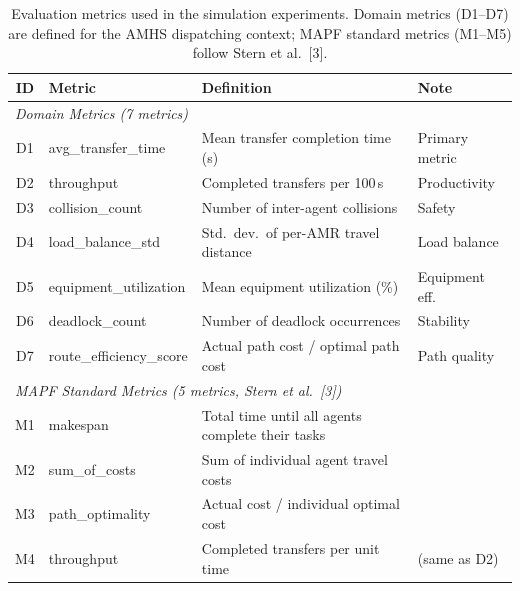 \begin{table}[htbp]
  \centering
  \caption{Evaluation metrics used in the simulation experiments.
           Domain metrics (D1--D7) are defined for the AMHS dispatching context;
           MAPF standard metrics (M1--M5) follow Stern et al.~[3].}
  \label{tab:4}
  \small
  \begin{threeparttable}
    \begin{tabular}{clll}
      \toprule
      \textbf{ID} & \textbf{Metric} & \textbf{Definition} & \textbf{Note} \\
      \midrule
      \multicolumn{4}{l}{\textit{Domain Metrics (7 metrics)}} \\
      \midrule
      D1 & avg\_transfer\_time  & Mean transfer completion time (s)               & Primary metric \\
      D2 & throughput           & Completed transfers per 100\,s                   & Productivity   \\
      D3 & collision\_count     & Number of inter-agent collisions                  & Safety         \\
      D4 & load\_balance\_std   & Std.\ dev.\ of per-AMR travel distance            & Load balance   \\
      D5 & equipment\_utilization & Mean equipment utilization (\%)                & Equipment eff. \\
      D6 & deadlock\_count      & Number of deadlock occurrences                    & Stability      \\
      D7 & route\_efficiency\_score & Actual path cost / optimal path cost         & Path quality   \\
      \midrule
      \multicolumn{4}{l}{\textit{MAPF Standard Metrics (5 metrics, Stern et al.~[3])}} \\
      \midrule
      M1 & makespan             & Total time until all agents complete their tasks  &                \\
      M2 & sum\_of\_costs       & Sum of individual agent travel costs              &                \\
      M3 & path\_optimality     & Actual cost / individual optimal cost             &                \\
      M4 & throughput           & Completed transfers per unit time                 & (same as D2)   \\

\end{tabular}
\end{threeparttable}
\end{table}

